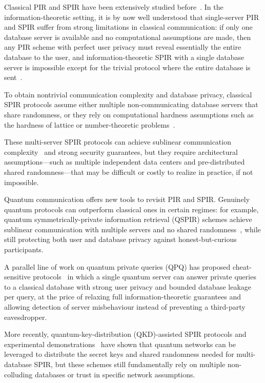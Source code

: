 \documentclass[%
 reprint,
superscriptaddress,
 amsmath,amssymb,
 aps,
]{revtex4-2}
\begin{document}
Classical PIR and SPIR have been extensively studied before~\cite{PIR1, PIR2, PIR3, SPIR1, SPIR2, SPIR3}. In the information-theoretic setting, it is by now well understood that single-server PIR and SPIR suffer from strong limitations in classical communication: if only one database server is available and no computational assumptions are made, then any PIR scheme with perfect user privacy must reveal essentially the entire database to the user, and information-theoretic SPIR with a single database server is impossible except for the trivial protocol where the entire database is sent~\cite{PIR1, PIR2}.


To obtain nontrivial communication complexity and database privacy, classical SPIR protocols assume either multiple non-communicating database servers that share randomness, or they rely on computational hardness assumptions such as the hardness of lattice or number-theoretic problems~\cite{SPIR1, SPIR2, SPIR3}.

These multi-server SPIR protocols can achieve sublinear communication complexity~\cite{SPIR1, SPIR2, SPIR3} and strong security guarantees, but they require architectural assumptions—such as multiple independent data centers and pre-distributed shared randomness—that may be difficult or costly to realize in practice, if not impossible.

Quantum communication offers new tools to revisit PIR and SPIR. Genuinely quantum protocols can outperform classical ones in certain regimes: for example, quantum symmetrically-private information retrieval (QSPIR) schemes achieve sublinear communication with multiple servers and no shared randomness~\cite{QSPIR_multiple_database1, QSPIR_multiple_database2}, while still protecting both user and database privacy against honest-but-curious participants.

A parallel line of work on quantum private queries (QPQ) has proposed cheat-sensitive protocols~\cite{QPQ1, QPQ2, QPQ3} in which a single quantum server can answer private queries to a classical database with strong user privacy and bounded database leakage per query, at the price of relaxing full information-theoretic guarantees and allowing detection of server misbehaviour instead of preventing a third-party eavesdropper.

More recently, quantum-key-distribution (QKD)-assisted SPIR protocols and experimental demonstrations~\cite{QSPIR_multiple_database1, QSPIR_multiple_database2} have shown that quantum networks can be leveraged to distribute the secret keys and shared randomness needed for multi-database SPIR, but these schemes still fundamentally rely on multiple non-colluding databases or trust in specific network assumptions.
\end{document}
